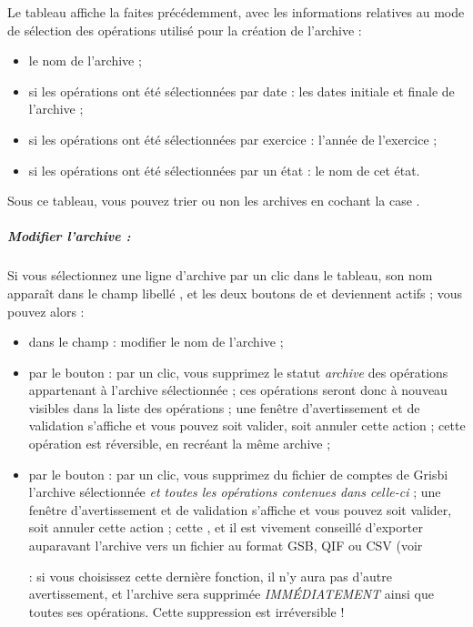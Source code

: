 Le tableau affiche la  faites précédemment, avec les informations relatives au mode de sélection des opérations utilisé pour la création de l'archive :

\begin{itemize}
	\item le nom de l'archive ;
	\item si les opérations ont été sélectionnées par date : les dates initiale et finale de l'archive ;
	\item si les opérations ont été sélectionnées par exercice : l'année de l'exercice ;	
	\item si les opérations ont été sélectionnées par un état : le nom de cet état.
	\end{itemize}	

Sous ce tableau, vous pouvez trier ou non les archives en cochant la case .



\subparagraph{Modifier l'archive :\label{setup-general-archives-remove}}

Si vous sélectionnez une ligne d'archive par un clic dans le tableau, son nom apparaît dans le champ libellé , et les deux boutons de   et  deviennent actifs ; vous pouvez alors :

\begin{itemize}
	\item dans le champ  : modifier le nom de l'archive ;	
	\item par le bouton  : par un clic, vous supprimez le statut \emph{archive} des opérations appartenant à l'archive sélectionnée ; ces opérations seront donc à nouveau visibles dans la liste des opérations ;  une fenêtre d'avertissement et de validation s'affiche et vous pouvez soit valider, soit annuler cette action ; cette opération est réversible, en recréant la même archive ;
	\item par le bouton  : par un clic, vous  supprimez du fichier de comptes de Grisbi l'archive sélectionnée \emph{et toutes les opérations contenues dans celle-ci} ; une fenêtre d'avertissement et de validation s'affiche et vous pouvez soit valider, soit annuler cette action ; cette , et il est vivement conseillé d'exporter auparavant l'archive vers un fichier au format \gls{GSB}, \gls{QIF} ou \gls{CSV} (voir 

 :  si vous choisissez cette dernière fonction, il n'y aura pas d'autre avertissement, et l'archive sera supprimée \emph{IMMÉDIATEMENT} ainsi que toutes ses opérations. Cette suppression est irréversible !
\end{itemize}


